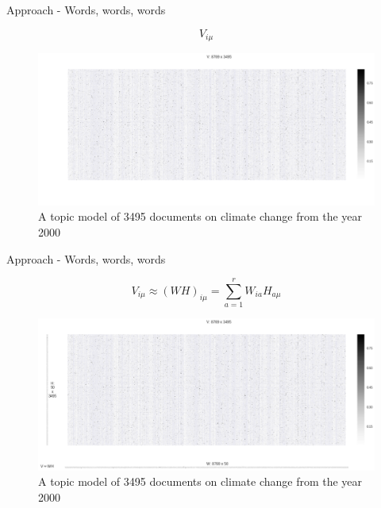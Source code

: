 \documentclass[9pt]{beamer}
\begin{document}
\begin{frame}{Approach - Words, words, words}

\begin{figure}
	
	\[V_{i\mu} \]
	
	\includegraphics[width=\linewidth]{../plots/VWH_blank.png}
	
	\caption{A topic model of 3495 documents on climate change from the year 2000}
	
\end{figure}

\end{frame}


\begin{frame}{Approach - Words, words, words}

\begin{figure}
	
	\[V_{i\mu} \approx (WH)_{i\mu} = \sum_{a=1}^{r}W_{ia}H_{a\mu} \]
	
	\includegraphics[width=\linewidth]{../plots/VWH.png}
	
	\caption{A topic model of 3495 documents on climate change from the year 2000}
	
\end{figure}


\end{frame}
\end{document}
